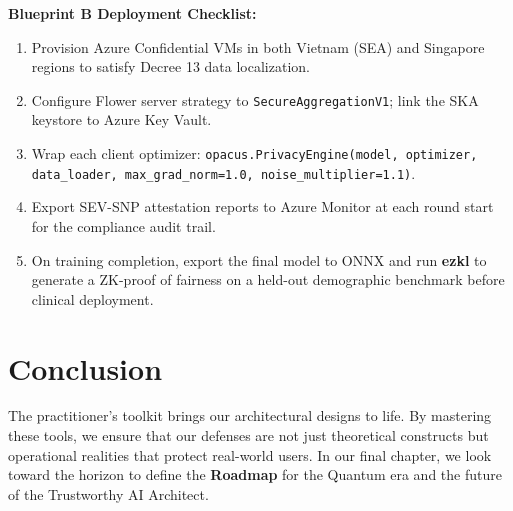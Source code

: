 \begin{svgraybox}
\textbf{Blueprint B Deployment Checklist:}
\begin{enumerate}
  \item Provision Azure Confidential VMs in both Vietnam (SEA) and Singapore regions to satisfy Decree 13 data localization.
  \item Configure Flower server strategy to \texttt{SecureAggregationV1}; link the SKA keystore to Azure Key Vault.
  \item Wrap each client optimizer: \texttt{opacus.PrivacyEngine(model, optimizer, data\_loader, max\_grad\_norm=1.0, noise\_multiplier=1.1)}.
  \item Export SEV-SNP attestation reports to Azure Monitor at each round start for the compliance audit trail.
  \item On training completion, export the final model to ONNX and run \textbf{ezkl} to generate a ZK-proof of fairness on a held-out demographic benchmark before clinical deployment.
\end{enumerate}
\end{svgraybox}

\section{Conclusion}
\label{sec:conclusion_toolkit}

The practitioner's toolkit brings our architectural designs to life. By mastering these tools, we ensure that our defenses are not just theoretical constructs but operational realities that protect real-world users. In our final chapter, we look toward the horizon to define the \textbf{Roadmap} for the Quantum era and the future of the Trustworthy AI Architect.


